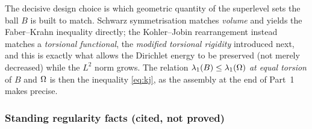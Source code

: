 The decisive design choice is which geometric quantity of the superlevel
sets the ball $B$ is built to match. Schwarz symmetrisation matches
\emph{volume} and yields the Faber--Krahn inequality directly; the
Kohler--Jobin rearrangement instead matches a \emph{torsional functional},
the \emph{modified torsional rigidity} introduced next, and this is exactly
what allows the Dirichlet energy to be preserved (not merely decreased)
while the $L^2$ norm grows. The relation $\lambda_1(B)\le\lambda_1(\Omega)$
\emph{at equal torsion} of $B$ and $\Omega$ is then the inequality
\eqref{eq:kj}, as the assembly at the end of Part~1 makes precise.

\subsubsection*{Standing regularity facts (cited, not proved)}
